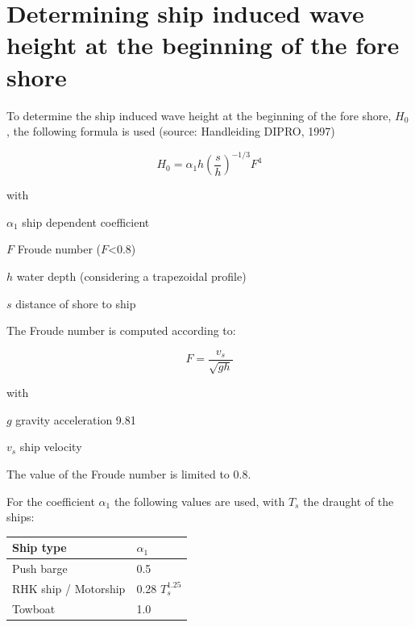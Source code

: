 \chapter{Determining ship induced wave height at the beginning of the fore shore}
To determine the ship induced wave height at the beginning of the fore shore, $H_0$ , the following formula is used (source: Handleiding DIPRO, 1997)

\begin{equation}
H_0 = \alpha_1 h \left ( \frac{s}{h} \right )^{-1/3} F^4
\end{equation}

with

\begin{symbollist}
\item[$\alpha_1$] ship dependent coefficient \unitbrackets{-}
\item[$F$] Froude number ($F$<0.8) \unitbrackets{-}
\item[$h$] water depth (considering a  trapezoidal profile) 
\item[$s$] distance of shore to ship 
\end{symbollist}

The Froude number is computed according to:

\begin{equation}
F = \frac{v_s}{\sqrt{g h}}
\end{equation}

with

\begin{symbollist}
\item[$g$] gravity acceleration 9.81 
\item[$v_s$] ship velocity 
\end{symbollist}

The value of the Froude number is limited to 0.8.

For the coefficient $\alpha_1$ the following values are used, with $T_s$  the draught of the ships:

\begin{tabular}{ll}
Ship type & $\alpha_1$ \\ \hline
Push barge & 0.5 \\
RHK ship / Motorship & 0.28 $T_s^\text{1.25}$ \\
Towboat & 1.0 \\ \hline
\end{tabular}

